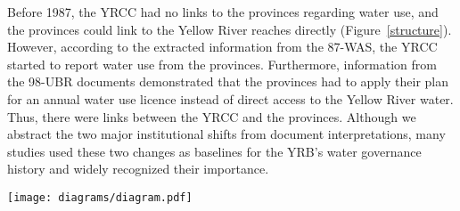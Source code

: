 Before 1987, the YRCC had no links to the provinces regarding water use, and the provinces could link to the Yellow River reaches directly (Figure~\ref{structure}). However, according to the extracted information from the 87-WAS, the YRCC started to report water use from the provinces. Furthermore, information from the 98-UBR documents demonstrated that the provinces had to apply their plan for an annual water use licence instead of direct access to the Yellow River water. Thus, there were links between the YRCC and the provinces.
Although we abstract the two major institutional shifts from document interpretations, many studies used these two changes as baselines for the YRB's water governance history and widely recognized their importance.


\begin{figure*}[!ht]
    \centering
    \texttt{[image: diagrams/diagram.pdf]}
	\caption{
		Institutional shifts and related SES structures in the Yellow River Basin (YRB). See \textit{Supplementary Material S1} for detailed introduction for the institutions.
		\textbf{1975–1987:} Without any constraints, water resources were freely accessible to each stakeholder (the provinces in this case, denoted by red circles) from a one-way but connected ecological unit (the Yellow River, denoted by the blue rectangle).
		\textbf{1987–1998:} After the implementation of policy 1 in 1987, each user was assigned a quota to withdraw surface water resources, and the YRCC (yellow triangle) was tasked with reporting on water quota use.
		\textbf{1998–2008:} After the implementation of policy 2, stakeholders had to apply for water resources from the YRCC, which then licensed water use according to the quota. Under this institution, the YRCC had direct two-way connections between provinces and ecological components.
	}
	\label{structure}
\end{figure*}
